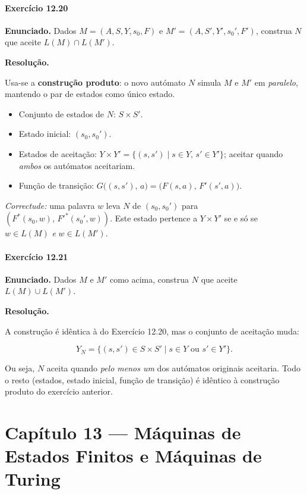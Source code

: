 \documentclass[12pt,a4paper]{article}
\newcommand{\keyword}[1]{\textbf{\textcolor{azul}{#1}}}
\begin{document}
\subsection*{Exercício 12.20}

\textbf{Enunciado.} Dados $M = (A, S, Y, s_0, F)$ e $M' = (A, S', Y', s_0', F')$,
construa $N$ que aceite $L(M) \cap L(M')$.

\medskip
\textbf{Resolução.}

Usa-se a \keyword{construção produto}: o novo autómato $N$ simula $M$ e $M'$ em
\emph{paralelo}, mantendo o par de estados como único estado.

\begin{itemize}
  \item Conjunto de estados de $N$: $S \times S'$.
  \item Estado inicial: $(s_0, s_0')$.
  \item Estados de aceitação: $Y \times Y' = \{(s, s') \mid s \in Y,\, s' \in Y'\}$;
        aceitar quando \emph{ambos} os autómatos aceitariam.
  \item Função de transição:
        $G\bigl((s, s'),\, a\bigr) = \bigl(F(s,a),\, F'(s', a)\bigr)$.
\end{itemize}

\medskip
\noindent\textit{Correctude:} uma palavra $w$ leva $N$ de $(s_0, s_0')$ para
$(F^*(s_0, w),\, F'^*(s_0', w))$. Este estado pertence a $Y \times Y'$ se e só se
$w \in L(M)$ \emph{e} $w \in L(M')$.

\subsection*{Exercício 12.21}

\textbf{Enunciado.} Dados $M$ e $M'$ como acima, construa $N$ que aceite $L(M) \cup L(M')$.

\medskip
\textbf{Resolução.}

A construção é idêntica à do Exercício 12.20, mas o conjunto de aceitação muda:

\[
  Y_N = \{(s, s') \in S \times S' \mid s \in Y \text{ ou } s' \in Y'\}.
\]

Ou seja, $N$ aceita quando \emph{pelo menos um} dos autómatos originais aceitaria.
Todo o resto (estados, estado inicial, função de transição) é idêntico à construção
produto do exercício anterior.

\newpage
\part*{Capítulo 13 — Máquinas de Estados Finitos e Máquinas de Turing}
\end{document}
